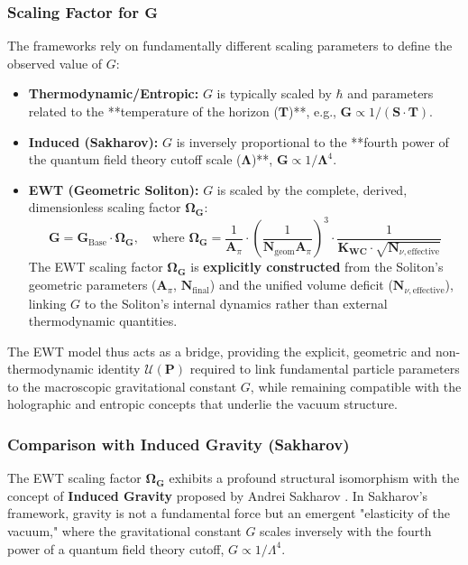 \documentclass[10pt,a4paper]{article}
\begin{document}
\subsubsection{Scaling Factor for $\mathbf{G}$}

The frameworks rely on fundamentally different scaling parameters to define the observed value of $G$:

\begin{itemize}
	\item \textbf{Thermodynamic/Entropic:} $G$ is typically scaled by $\mathbf{\hbar}$ and parameters related to the **temperature of the horizon ($\mathbf{T}$)**, e.g., $\mathbf{G} \propto 1/(\mathbf{S} \cdot \mathbf{T})$.
	\item \textbf{Induced (Sakharov):} $G$ is inversely proportional to the **fourth power of the quantum field theory cutoff scale ($\mathbf{\Lambda}$)**, $\mathbf{G} \propto 1/\mathbf{\Lambda}^4$.
\item \textbf{EWT (Geometric Soliton):} $G$ is scaled by the complete, derived, dimensionless scaling factor $\mathbf{\Omega_G}$:
\begin{equation}
	\mathbf{G} = \mathbf{G}_{\text{Base}} \cdot \mathbf{\Omega_G}, \quad \text{where } \mathbf{\Omega_G} = \frac{1}{\mathbf{A}_{\pi}} \cdot \left( \frac{1}{\mathbf{N}_{\text{geom}} \mathbf{A}_{\pi}} \right)^{3} \cdot \frac{1}{\mathbf{K_{WC}} \cdot \sqrt{\mathbf{N}_{\nu, \text{effective}}}}
\end{equation}
The EWT scaling factor $\mathbf{\Omega_G}$ is \textbf{explicitly constructed} from the Soliton's geometric parameters ($\mathbf{A}_{\pi}$, $\mathbf{N}_{\text{final}}$) and the unified volume deficit ($\mathbf{N}_{\nu, \text{effective}}$), linking $G$ to the Soliton's internal dynamics rather than external thermodynamic quantities.
\end{itemize}

The EWT model thus acts as a bridge, providing the explicit, geometric and non-thermodynamic identity $\mathcal{U}(\mathbf{P})$ required to link fundamental particle parameters to the macroscopic gravitational constant $G$, while remaining compatible with the holographic and entropic concepts that underlie the vacuum structure.

\subsubsection*{Comparison with Induced Gravity (Sakharov)}
\label{sub:sakaharov_compare}
The EWT scaling factor $\mathbf{\Omega_G}$ exhibits a profound structural isomorphism with the concept of \textbf{Induced Gravity} proposed by Andrei Sakharov \cite{sakharov1968}. In Sakharov's framework, gravity is not a fundamental force but an emergent "elasticity of the vacuum," where the gravitational constant $G$ scales inversely with the fourth power of a quantum field theory cutoff, $G \propto 1/\Lambda^4$.
\end{document}
